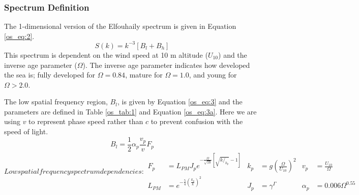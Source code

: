 \subsubsection{Spectrum Definition}
The 1-dimensional version of the Elfouhaily spectrum is given in Equation \ref{os_eq:2}.
\begin{equation}
  \label{os_eq:2}
  S(k) = k^{-3}\left[B_l + B_h \right]
\end{equation}
\renewcommand{\baselinestretch}{2} \small\normalsize
This spectrum is dependent on the wind speed at 10 m altitude ($U_{10}$) and the inverse age parameter ($\Omega$). The inverse age parameter indicates how developed the sea is; fully developed for $\Omega = 0.84$, mature for $\Omega = 1.0$, and young for $\Omega > 2.0$. 

The low spatial frequency region, $B_l$, is given by Equation \ref{os_eq:3} and the parameters are defined in Table \ref{os_tab:1} and Equation \ref{os_eq:3a}. Here we are using $v$ to represent phase speed rather than $c$ to prevent confusion with the speed of light.
\begin{equation}
  \label{os_eq:3}
 B_l = \frac{1}{2} \alpha_p \frac{v_p}{v} F_p
\end{equation}
\renewcommand{\baselinestretch}{2} \small\normalsize
\begin{subequations}
\label{os_eq:3a}
   Low spatial frequency spectrum dependencies:
\begin{align}
  F_p &= L_{PM}J_pe^{-\frac{\Omega}{\sqrt{10}}\left[\sqrt{k/_{k_p}} - 1 \right]} &  k_p &= g\left(\frac{\Omega}{U_{10}}\right)^2 & v_p &= \frac{U_{10}}{\Omega} \\
   L_{PM} &=e^{-\frac{5}{4}\left(\frac{k_p}{k} \right)^2} &  J_p &= \gamma^\Gamma  & \alpha_p &= 0.006\Omega^{0.55} 
\end{align}
\end{subequations}
\renewcommand{\baselinestretch}{2} \small\normalsize
